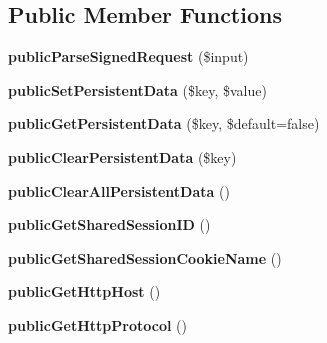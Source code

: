 \subsection*{Public Member Functions}
\begin{DoxyCompactItemize}
\item 
\hypertarget{classPersistentFBPublic_a46702277ec4586217f15f85f37c99dc4}{{\bfseries public\-Parse\-Signed\-Request} (\$input)}\label{classPersistentFBPublic_a46702277ec4586217f15f85f37c99dc4}

\item 
\hypertarget{classPersistentFBPublic_aa44ad4640453041b9787177566082fee}{{\bfseries public\-Set\-Persistent\-Data} (\$key, \$value)}\label{classPersistentFBPublic_aa44ad4640453041b9787177566082fee}

\item 
\hypertarget{classPersistentFBPublic_a83d5bb2871764d124bb9e4e6f1eabe31}{{\bfseries public\-Get\-Persistent\-Data} (\$key, \$default=false)}\label{classPersistentFBPublic_a83d5bb2871764d124bb9e4e6f1eabe31}

\item 
\hypertarget{classPersistentFBPublic_ac6ed45b8a5717065ecdcd33e90672d0d}{{\bfseries public\-Clear\-Persistent\-Data} (\$key)}\label{classPersistentFBPublic_ac6ed45b8a5717065ecdcd33e90672d0d}

\item 
\hypertarget{classPersistentFBPublic_a08e1cf81e885fc870bc8371248e6f27d}{{\bfseries public\-Clear\-All\-Persistent\-Data} ()}\label{classPersistentFBPublic_a08e1cf81e885fc870bc8371248e6f27d}

\item 
\hypertarget{classPersistentFBPublic_aa446c2dad94366ae3d25a707bd190028}{{\bfseries public\-Get\-Shared\-Session\-I\-D} ()}\label{classPersistentFBPublic_aa446c2dad94366ae3d25a707bd190028}

\item 
\hypertarget{classPersistentFBPublic_ae632685d4c4ae4abc17f9eed7912818f}{{\bfseries public\-Get\-Shared\-Session\-Cookie\-Name} ()}\label{classPersistentFBPublic_ae632685d4c4ae4abc17f9eed7912818f}

\item 
\hypertarget{classPersistentFBPublic_a56b7d6f3f343b623e542aebeb39e3e11}{{\bfseries public\-Get\-Http\-Host} ()}\label{classPersistentFBPublic_a56b7d6f3f343b623e542aebeb39e3e11}

\item 
\hypertarget{classPersistentFBPublic_a2d87a70d47c32d968baee9b80c053d63}{{\bfseries public\-Get\-Http\-Protocol} ()}\label{classPersistentFBPublic_a2d87a70d47c32d968baee9b80c053d63}

\end{DoxyCompactItemize}
